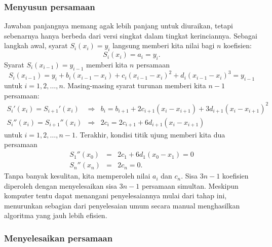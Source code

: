 \subsubsection{Menyusun persamaan}

Jawaban panjangnya memang agak lebih panjang untuk diuraikan, tetapi
sebenarnya hanya berbeda dari versi singkat dalam tingkat kerinciannya.
Sebagai langkah awal, syarat $S_{i}(x_{i})=y_{i}$ langsung memberi
kita nilai bagi $n$ koefisien:
\[
S_{i}(x_{i})=a_{i}=y_{i}.
\]
Syarat $S_{i}(x_{i-1})=y_{i-1}$ memberi kita $n$ persamaan
\begin{equation}
S_{i}(x_{i-1})=y_{i}+b_{i}(x_{i-1}-x_{i})+c_{i}(x_{i-1}-x_{i})^{2}+d_{i}(x_{i-1}-x_{i})^{3}=y_{i-1}\label{eq:interpolationRequirement}
\end{equation}
untuk $i=1,2,\ldots,n$. Masing-masing syarat turunan memberi kita
$n-1$ persamaan:
\begin{eqnarray}
S_{i}'(x_{i})=S_{i+1}'(x_{i}) & \Rightarrow & b_{i}=b_{i+1}+2c_{i+1}(x_{i}-x_{i+1})+3d_{i+1}(x_{i}-x_{i+1})^{2}\label{eq:firstDerivativeRequirement}\\
S_{i}''(x_{i})=S_{i+1}''(x_{i}) & \Rightarrow & 2c_{i}=2c_{i+1}+6d_{i+1}(x_{i}-x_{i+1})\label{eq:secondDerivative Requirement}
\end{eqnarray}
untuk $i=1,2,\ldots,n-1$. Terakhir, kondisi titik ujung memberi kita
dua persamaan
\begin{eqnarray}
S_{1}''(x_{0}) & = & 2c_{1}+6d_{1}(x_{0}-x_{1})=0\label{eq:freeLeftEndpoint}\\
S_{n}''(x_{n}) & = & 2c_{n}=0.\label{eq:freeRightEndpoint}
\end{eqnarray}
Tanpa banyak kesulitan, kita memperoleh nilai $a_{i}$ dan $c_{n}$.
Sisa $3n-1$ koefisien diperoleh dengan menyelesaikan sisa $3n-1$
persamaan simultan. Meskipun komputer tentu dapat menangani penyelesaiannya
mulai dari tahap ini, menurunkan sebagian dari penyelesaian umum secara
manual menghasilkan algoritma yang jauh lebih efisien.

\subsubsection{Menyelesaikan persamaan}

